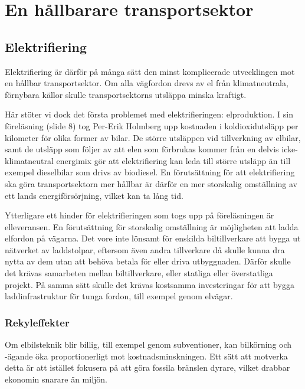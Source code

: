 \documentclass{article}
\begin{document}

\clearpage
\section{En hållbarare transportsektor}

\subsection{Elektrifiering}

Elektrifiering är därför på många sätt den minst komplicerade utvecklingen mot en hållbar transportsektor. Om alla vägfordon drevs av el från klimatneutrala, förnybara källor skulle transportsektorns utsläppa minska kraftigt.

Här stöter vi dock det första problemet med elektrifieringen: elproduktion. I sin föreläsning (slide 8) tog Per-Erik Holmberg upp kostnaden i koldioxidutsläpp per kilometer för olika former av bilar. De större utsläppen vid tillverkning av elbilar, samt de utsläpp som följer av att elen som förbrukas kommer från en delvis icke-klimatneutral energimix gör att elektrifiering kan leda till större utsläpp än till exempel dieselbilar som drivs av biodiesel. En förutsättning för att elektrifiering ska göra transportsektorn mer hållbar är därför en mer storskalig omställning av ett lands energiförsörjning, vilket kan ta lång tid.

Ytterligare ett hinder för elektrifieringen som togs upp på föreläsningen är elleveransen. En förutsättning för storskalig omställning är möjligheten att ladda elfordon på vägarna. Det vore inte lönsamt för enskilda biltillverkare att bygga ut nätverket av laddstolpar, eftersom även andra tillverkare då skulle kunna dra nytta av dem utan att behöva betala för eller driva utbyggnaden. Därför skulle det krävas samarbeten mellan biltillverkare, eller statliga eller överstatliga projekt. På samma sätt skulle det krävas kostsamma investeringar för att bygga laddinfrastruktur för tunga fordon, till exempel genom elvägar.

\subsubsection{Rekyleffekter}

Om elbilsteknik blir billig, till exempel genom subventioner, kan bilkörning och -ägande öka proportionerligt mot kostnadsminskningen. Ett sätt att motverka detta är att istället fokusera på att göra fossila bränslen dyrare, vilket drabbar ekonomin snarare än miljön.
\end{document}
